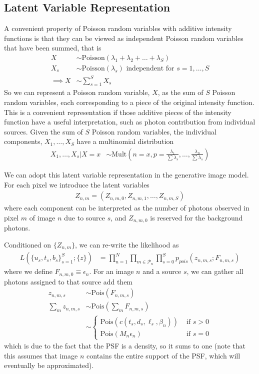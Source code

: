 \documentclass[11pt]{article}
\begin{document}
\subsection{Latent Variable Representation}
A convenient property of Poisson random variables with additive intensity functions is that they can be viewed as independent Poisson random variables that have been summed, that is
\begin{align}
  X &\sim \textrm{Poisson}(\lambda_1 + \lambda_2 + \dots + \lambda_S) \\
  X_s &\sim \textrm{Poisson}(\lambda_s) \text{ independent for } s = 1, \dots, S \\
  \implies
  X &\sim \sum_{s=1}^S X_s
\end{align}
So we can represent a Poisson random variable, $X$, as the sum of $S$ Poisson random variables, each corresponding to a piece of the original intensity function.  This is a convenient representation if those additive pieces of the intensity function have a useful interpretation, such as photon contribution from individual sources.  Given the sum of $S$ Poisson random variables, the individual components, $X_1, \dots, X_S$ have a multinomial distribution 
\begin{align}
  X_1, \dots, X_s | X=x &\sim \textrm{Mult}\left(n=x, p= \frac{\lambda_1}{\sum \lambda_s}, \dots, \frac{\lambda_S}{\sum \lambda_s} \right) 
\end{align}

We can adopt this latent variable representation in the generative image model.  For each pixel we introduce the latent variables
\begin{align}
 Z_{n,m} = (Z_{n,m,0}, Z_{n,m,1}, \dots, Z_{n,m,S})
\end{align}
where each component can be interpreted as the number of photons observed in pixel $m$ of image $n$ due to source $s$, and $Z_{n,m,0}$ is reserved for the background photons.  

Conditioned on $\{Z_{n,m}\}$, we can re-write the likelihood as 
\begin{align}
  L(\{u_s, t_s, b_s\}_{s=1}^S; \{z\})
     &= \prod_{n=1}^N \prod_{m \in \mathcal{P}_n} \prod_{s=0}^S  p_{pois}(z_{n,m,s} ; F_{n,m, s}) 
\end{align}
where we define $F_{n,m,0} \equiv \epsilon_n$.  For an image $n$ and a source $s$, we can gather all photons assigned to that source add them
\begin{align}
  z_{n,m,s} &\sim \textrm{Pois}(F_{n,m,s}) \\
  \sum_{m} z_{n,m,s} &\sim \textrm{Pois}\left( \sum_{m} F_{n,m,s} \right) \\
    &\sim \begin{cases}
         \textrm{Pois}( c(t_s, d_s, \ell_s, \beta_n) ) & \text{ if } s > 0  \\
         \textrm{Pois}( M_n \epsilon_n ) & \text{ if } s = 0 
       \end{cases}
\end{align}
which is due to the fact that the PSF is a density, so it sums to one (note that this assumes that image $n$ contains the entire support of the PSF, which will eventually be approximated).  
\end{document}
